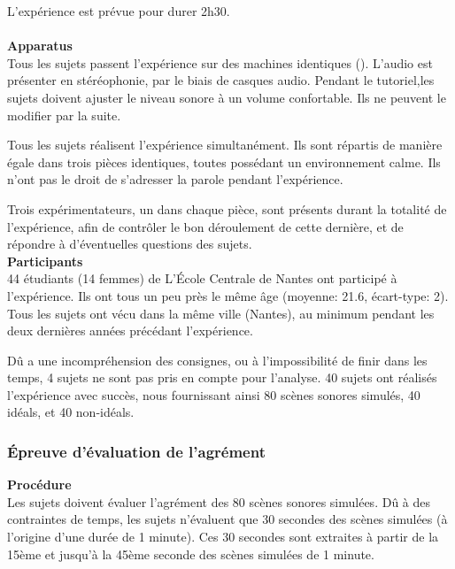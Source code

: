 L'expérience est prévue pour durer 2h30. \\


 \\


\textbf{Apparatus} \\

Tous les sujets passent l'expérience sur des machines identiques (). L'audio est présenter en stéréophonie, par le biais de casques audio. Pendant le tutoriel,les sujets doivent ajuster le niveau sonore à un volume confortable. Ils ne peuvent le modifier par la suite.

Tous les sujets réalisent l'expérience simultanément. Ils sont répartis de manière égale dans trois pièces identiques, toutes possédant un environnement calme. Ils n'ont pas le droit de s'adresser la parole pendant l'expérience.

Trois expérimentateurs, un dans chaque pièce, sont présents durant la totalité de l'expérience, afin de contrôler le bon déroulement de cette dernière, et de répondre à d'éventuelles questions des sujets.  \\

\textbf{Participants} \\

44 étudiants (14 femmes) de L’École Centrale de Nantes ont participé à l'expérience. Ils ont tous un peu près le même âge (moyenne: 21.6, écart-type: 2). Tous les sujets ont vécu dans la même ville (Nantes), au minimum pendant les deux dernières années précédant l'expérience.

Dû a une incompréhension des consignes, ou à l'impossibilité de finir dans les temps, 4 sujets ne sont pas pris en compte pour l'analyse. 40 sujets ont réalisés l'expérience avec succès, nous fournissant ainsi 80 scènes sonores simulés, 40 idéals, et 40 non-idéals.

\subsubsection{Épreuve d'évaluation de l'agrément}

\textbf{Procédure} \\

Les sujets doivent évaluer l'agrément des 80 scènes sonores simulées. Dû à des contraintes de temps, les sujets n'évaluent que 30 secondes des scènes simulées (à l'origine d'une durée de 1 minute). Ces 30 secondes sont extraites à partir de la 15ème et jusqu'à la 45ème seconde des scènes simulées de 1 minute.

